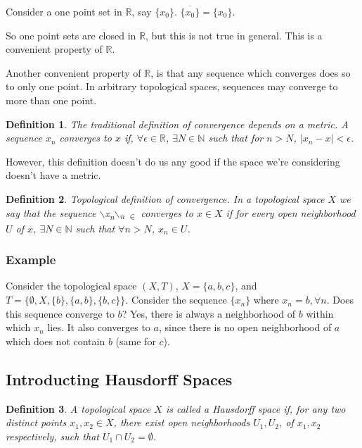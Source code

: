 \documentclass[11pt]{article}
\newtheorem{definition}{Definition}[section]
\begin{document}
Consider a one point set in \(\mathbb{R}\), say
\(\{x_0\}\). \(\overline{\{x_0\}} = \{x_0\}\).

So one point sets are closed in \(\mathbb{R}\), but this is not true in
general. This is a convenient property of \(\mathbb{R}\).

Another convenient property of \(\mathbb{R}\), is that any sequence
which converges does so to only one point. In arbitrary topological
spaces, sequences may converge to more than one point. 

\begin{definition}
The traditional definition of convergence depends on a metric. A
sequence \(x_n\) converges to \(x\) if, \(\forall \epsilon \in \mathbb{R}\),
\(\exists N \in \mathbb{N}\) such that for \(n > N\), \(|x_n - x| <
\epsilon\).
\end{definition}

However, this definition doesn't do us any good if the space we're
considering doesn't have a metric. 

\begin{definition}
Topological definition of convergence. In a topological space \(X\) we
say that the sequence $\backslash${x\textsubscript{n}$\backslash$}\textsubscript{n \(\in\) } converges to \(x \in
X\) if for every open neighborhood \(U\) of \(x\), \(\exists N \in
\mathbb{N}\) such that \(\forall n > N\), \(x_n \in U\).
\end{definition}

\subsubsection{Example}
\label{sec:orgccfd63f}
Consider the topological space \((X, T)\), \(X = \{ a, b, c\}\), and \(T =
\{\emptyset, X, \{b\}, \{a, b\}, \{b, c\}\}\). Consider the sequence
\(\{x_n\}\) where \(x_n = b, \forall n\). Does this sequence converge to
\(b\)? Yes, there is always a neighborhood of \(b\) within which \(x_n\)
lies. It also converges to \(a\), since there is no open neighborhood of
\(a\) which does not contain \(b\) (same for \(c\)). 

\subsection{Introducting Hausdorff Spaces}
\label{sec:org6a4a75c}
\begin{definition}
A topological space \(X\) is called a Hausdorff space if, for any two
distinct points \(x_1, x_2 \in X\), there exist open neighborhoods \(U_1,
U_2\), of \(x_1, x_2\) respectively, such that \(U_1\cap U_2 = \emptyset\).
\end{definition}
\end{document}

